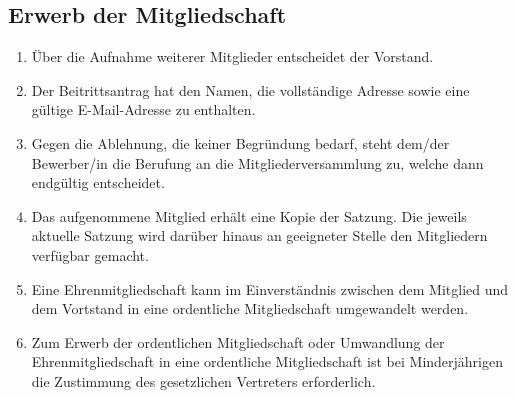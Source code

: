 \documentclass[12pt,a4paper,draft]{article}
\begin{document}
\subsection{Erwerb der Mitgliedschaft} %
\begin{enumerate}
\item Über die Aufnahme weiterer Mitglieder entscheidet der Vorstand.

\item Der Beitrittsantrag hat den Namen, die vollständige Adresse sowie eine 
gültige E-Mail-Adresse zu enthalten.

\item Gegen die Ablehnung, die keiner Begründung bedarf, steht dem/der 
Bewerber/in die Berufung an die Mitgliederversammlung zu, welche dann 
endgültig entscheidet.

\item Das aufgenommene Mitglied erhält eine Kopie der Satzung. Die jeweils 
aktuelle Satzung wird darüber hinaus an geeigneter Stelle den Mitgliedern 
verfügbar gemacht.

\item Eine Ehrenmitgliedschaft kann im Einverständnis zwischen dem Mitglied 
und dem Vortstand in eine ordentliche Mitgliedschaft umgewandelt werden.

\item Zum Erwerb der ordentlichen Mitgliedschaft oder Umwandlung der 
Ehrenmitgliedschaft in eine ordentliche Mitgliedschaft ist bei 
Minderjährigen die Zustimmung des gesetzlichen Vertreters erforderlich.
\end{enumerate}
\end{document}
